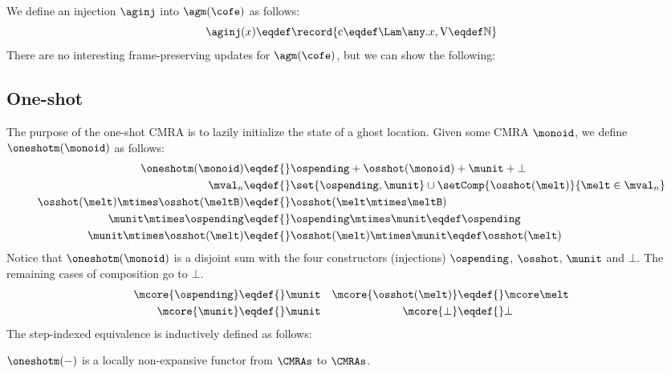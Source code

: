 We define an injection $\aginj$ into $\agm(\cofe)$ as follows:
\[ \aginj(x) \eqdef \record{\mathrm c \eqdef \Lam \any. x, \mathrm V \eqdef \mathbb{N}} \]
There are no interesting frame-preserving updates for $\agm(\cofe)$, but we can show the following:
\begin{mathpar}

  
\end{mathpar}

\subsection{One-shot}

The purpose of the one-shot CMRA is to lazily initialize the state of a ghost location.
Given some CMRA $\monoid$, we define $\oneshotm(\monoid)$ as follows:
\begin{align*}
  \oneshotm(\monoid) \eqdef{}& \ospending + \osshot(\monoid) + \munit + \bot \\
  \mval_n \eqdef{}& \set{\ospending, \munit} \cup \setComp{\osshot(\melt)}{\melt \in \mval_n}
\\%
  \osshot(\melt) \mtimes \osshot(\meltB) \eqdef{}& \osshot(\melt \mtimes \meltB) \\
  \munit \mtimes \ospending \eqdef{}& \ospending \mtimes \munit \eqdef \ospending \\
  \munit \mtimes \osshot(\melt) \eqdef{}& \osshot(\melt) \mtimes \munit \eqdef \osshot(\melt)
\end{align*}%
Notice that $\oneshotm(\monoid)$ is a disjoint sum with the four constructors (injections) $\ospending$, $\osshot$, $\munit$ and $\bot$.
The remaining cases of composition go to $\bot$.
\begin{align*}
  \mcore{\ospending} \eqdef{}& \munit & \mcore{\osshot(\melt)} \eqdef{}& \mcore\melt \\
  \mcore{\munit} \eqdef{}& \munit &  \mcore{\bot} \eqdef{}& \bot
\end{align*}
The step-indexed equivalence is inductively defined as follows:
\begin{mathpar}



\end{mathpar}
$\oneshotm(-)$ is a locally non-expansive functor from $\CMRAs$ to $\CMRAs$.

